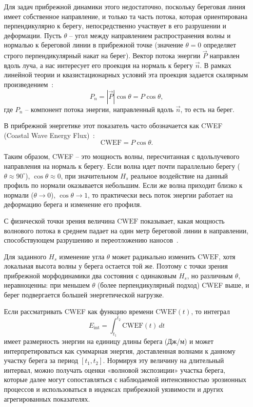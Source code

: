 Для задач прибрежной динамики этого недостаточно, поскольку береговая линия имеет собственное направление, и только та часть потока, которая ориентирована перпендикулярно к берегу, непосредственно участвует в его разрушении и деформации.
Пусть $\theta$ -- угол между направлением распространения волны и нормалью к береговой линии в прибрежной точке (значение $\theta = 0$ определяет строго перпендикулярный накат на берег). 
Вектор потока энергии $\vec{P}$ направлен вдоль луча, а нас интересует его проекция на нормаль к берегу $\vec{n}$. 
В рамках линейной теории и квазистационарных условий эта проекция задается скалярным произведением~\cite{GalalTakewaka2011}:
\begin{equation}
    P_n = |\vec{P}|\cos\theta = P\cos\theta,
\end{equation}
где $P_n$ -- компонент потока энергии, направленный вдоль $\vec{n}$, то есть на берег. 

В прибрежной энергетике этот показатель часто обозначается как CWEF (Coastal Wave Energy Flux)~\cite{Ghanavati2023_wave_surge_coastlines}:
\begin{equation}\label{eq:CWEF}
    \text{CWEF} = P\cos\theta.
\end{equation}

Таким образом, CWEF -- это мощность волны, пересчитанная с вдольлучевого направления на нормаль к берегу. 
Если волна идет почти параллельно берегу ($\theta \approx 90^\circ$), $\cos\theta \approx 0$, при значительном $H_s$ реальное воздействие на данный профиль по нормали оказывается небольшим. 
Если же волна приходит близко к нормали ($\theta \to 0$), $\cos\theta \to 1$, то практически весь поток энергии работает на деформацию берега и изменение его профиля.

С физической точки зрения величина $\text{CWEF}$ показывает, какая мощность волнового потока в среднем падает на один метр береговой линии в направлении, способствующем разрушению и переотложению наносов~\cite{Pang_2023_CoastalErosionClimate}.

Для заданного $H_s$ изменение угла $\theta$ может радикально изменить $\text{CWEF}$, хотя локальная высота волны у берега остается той же. 
Поэтому с точки зрения прибрежной морфодинамики два состояния с одинаковым $H_s$, но различным $\theta$, неравноценны: при меньшем $\theta$ (более перпендикулярный подход) CWEF выше, и берег подвергается большей энергетической нагрузке.

Если рассматривать CWEF как функцию времени $\text{CWEF}(t)$, то интеграл
\begin{equation}
    E_\text{int} = \int_{t_1}^{t_2} \text{CWEF}(t)\,dt
\end{equation}
имеет размерность энергии на единицу длины берега (Дж/м) и может интерпретироваться как суммарная энергия, доставленная волнами к данному участку берега за период $[t_1, t_2]$. Нормируя эту величину на длительный интервал, можно получать оценки «волновой экспозиции» участка берега, которые далее могут сопоставляться с наблюдаемой интенсивностью эрозионных процессов и использоваться в индексах прибрежной уязвимости и других агрегированных показателях.
